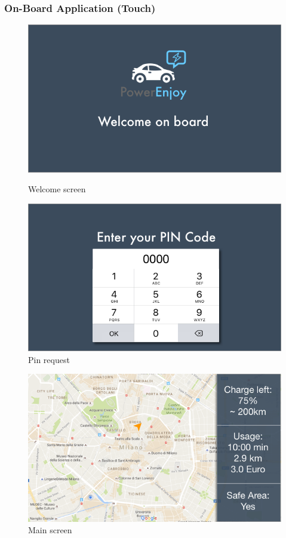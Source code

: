 \documentclass[12pt]{article}
\begin{document}
 	 	\subsubsection{On-Board Application (Touch)}
 	 	 \begin{figure}
		 \centering	
		\vspace{-17cm}		 
		\includegraphics[scale=0.6]{Images/onBoard/Welcome.png}
		 \caption{Welcome screen}
		 \centering
 	 	\includegraphics[scale=0.6]{Images/onBoard/Pin.png}
		  \caption{Pin request}
 	 	\end{figure}
 	 	\clearpage
 	 	\begin{figure}
		 \centering	
		\includegraphics[scale=0.6]{Images/onBoard/Main.png}
		 \caption{Main screen}
 	 	\end{figure}
 	 	\clearpage
 	 	
\end{document}
